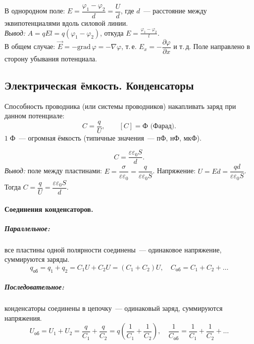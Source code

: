 \documentclass[12pt]{article}
\begin{document}
\begin{statement}
	В однородном поле: $E = \dfrac{\varphi_1 - \varphi_2}{d} = \dfrac{U}{d}$, где $d$~--- расстояние между эквипотенциалями вдоль силовой линии.\\
	\textit{Вывод:} $A = qEl = q(\varphi_1 - \varphi_2)$, откуда $E = \frac{\varphi_1-\varphi_2}{l}$.\\
	В общем случае: $\vec{E} = -\text{grad}\,\varphi = -\nabla\varphi$, т.\,е. $E_x = -\dfrac{\partial\varphi}{\partial x}$ и т.\,д. Поле направлено в сторону убывания потенциала.
\end{statement}

\subsection{Электрическая ёмкость. Конденсаторы}

\begin{definition}[Электроёмкость]
	Способность проводника (или системы проводников) накапливать заряд при данном потенциале:
	\[
		C = \frac{q}{U}, \qquad [C] = \text{Ф (Фарад)}.
	\]
	$1 \; \text{Ф}$~--- огромная ёмкость (типичные значения~--- пФ, нФ, мкФ).
\end{definition}

\begin{definition}
	\[
		C = \frac{\varepsilon\varepsilon_0 S}{d}.
	\]
	\textit{Вывод:} поле между пластинами: $E = \dfrac{\sigma}{\varepsilon\varepsilon_0} = \dfrac{q}{\varepsilon\varepsilon_0 S}$. Напряжение: $U = Ed = \dfrac{qd}{\varepsilon\varepsilon_0 S}$. Тогда $C = \dfrac{q}{U} = \dfrac{\varepsilon\varepsilon_0 S}{d}$.
\end{definition}

\paragraph{Соединения конденсаторов.}

\subparagraph{Параллельное:} все пластины одной полярности соединены~--- одинаковое напряжение, суммируются заряды.
\[
	q_{\text{об}} = q_1 + q_2 = C_1 U + C_2 U = (C_1+C_2)U, \quad \boxed{C_{\text{об}} = C_1 + C_2 + \ldots}
\]

\subparagraph{Последовательное:} конденсаторы соединены в цепочку~--- одинаковый заряд, суммируются напряжения.
\[
	U_{\text{об}} = U_1 + U_2 = \frac{q}{C_1} + \frac{q}{C_2} = q\left(\frac{1}{C_1}+\frac{1}{C_2}\right), \quad \boxed{\frac{1}{C_{\text{об}}} = \frac{1}{C_1} + \frac{1}{C_2} + \ldots}
\]
\end{document}
